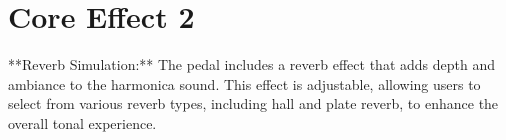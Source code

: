 \chapter{Core Effect 2}

**Reverb Simulation:**  
The pedal includes a reverb effect that adds depth and ambiance to the harmonica sound. This effect is adjustable, allowing users to select from various reverb types, including hall and plate reverb, to enhance the overall tonal experience.

